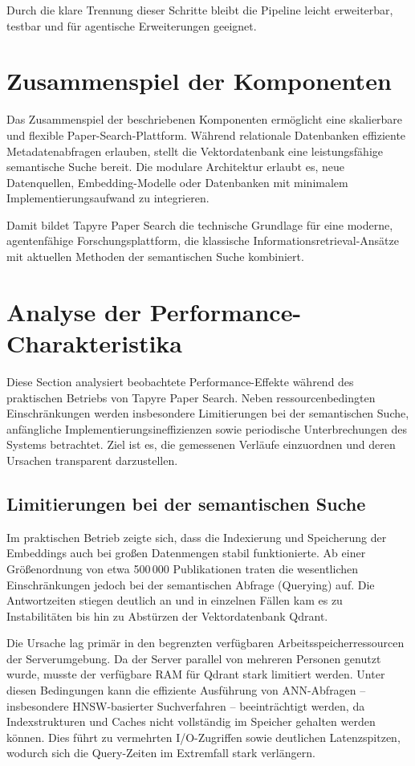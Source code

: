 Durch die klare Trennung dieser Schritte bleibt die Pipeline leicht erweiterbar, testbar und für agentische Erweiterungen geeignet.

\section{Zusammenspiel der Komponenten}

Das Zusammenspiel der beschriebenen Komponenten ermöglicht eine skalierbare und flexible Paper-Search-Plattform. Während relationale Datenbanken effiziente Metadatenabfragen erlauben, stellt die Vektordatenbank eine leistungsfähige semantische Suche bereit. Die modulare Architektur erlaubt es, neue Datenquellen, Embedding-Modelle oder Datenbanken mit minimalem Implementierungsaufwand zu integrieren.

Damit bildet Tapyre Paper Search die technische Grundlage für eine moderne, agentenfähige Forschungsplattform, die klassische Informationsretrieval-Ansätze mit aktuellen Methoden der semantischen Suche kombiniert.
\section{Analyse der Performance-Charakteristika}

Diese Section analysiert beobachtete Performance-Effekte während des praktischen Betriebs von Tapyre Paper Search. Neben ressourcenbedingten Einschränkungen werden insbesondere Limitierungen bei der semantischen Suche, anfängliche Implementierungsineffizienzen sowie periodische Unterbrechungen des Systems betrachtet. Ziel ist es, die gemessenen Verläufe einzuordnen und deren Ursachen transparent darzustellen.

\subsection{Limitierungen bei der semantischen Suche}

Im praktischen Betrieb zeigte sich, dass die Indexierung und Speicherung der Embeddings auch bei großen Datenmengen stabil funktionierte. Ab einer Größenordnung von etwa 500\,000 Publikationen traten die wesentlichen Einschränkungen jedoch bei der semantischen Abfrage (Querying) auf. Die Antwortzeiten stiegen deutlich an und in einzelnen Fällen kam es zu Instabilitäten bis hin zu Abstürzen der Vektordatenbank Qdrant.

Die Ursache lag primär in den begrenzten verfügbaren Arbeitsspeicherressourcen der Serverumgebung. Da der Server parallel von mehreren Personen genutzt wurde, musste der verfügbare RAM für Qdrant stark limitiert werden. Unter diesen Bedingungen kann die effiziente Ausführung von ANN-Abfragen – insbesondere HNSW-basierter Suchverfahren – beeinträchtigt werden, da Indexstrukturen und Caches nicht vollständig im Speicher gehalten werden können. Dies führt zu vermehrten I/O-Zugriffen sowie deutlichen Latenzspitzen, wodurch sich die Query-Zeiten im Extremfall stark verlängern.

